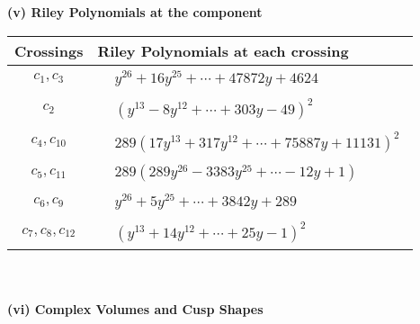 \documentclass[1p]{elsarticle_modified}
\theoremstyle{definition}
\begin{document}
\newpage\renewcommand{\arraystretch}{1}
\flushleft \textbf{(v) Riley Polynomials at the component}\newline \\
\begin{tabular}{m{50pt}|m{274pt}}
Crossings & \hspace{64pt}Riley Polynomials at each crossing \\
\hline $$\begin{aligned}c_{1},c_{3}\end{aligned}$$&$\begin{aligned}
&y^{26}+16 y^{25}+\cdots+47872 y+4624
\end{aligned}$\\
\hline $$\begin{aligned}c_{2}\end{aligned}$$&$\begin{aligned}
&(y^{13}-8 y^{12}+\cdots+303 y-49)^{2}
\end{aligned}$\\
\hline $$\begin{aligned}c_{4},c_{10}\end{aligned}$$&$\begin{aligned}
&289(17 y^{13}+317 y^{12}+\cdots+75887 y+11131)^{2}
\end{aligned}$\\
\hline $$\begin{aligned}c_{5},c_{11}\end{aligned}$$&$\begin{aligned}
&289(289 y^{26}-3383 y^{25}+\cdots-12 y+1)
\end{aligned}$\\
\hline $$\begin{aligned}c_{6},c_{9}\end{aligned}$$&$\begin{aligned}
&y^{26}+5 y^{25}+\cdots+3842 y+289
\end{aligned}$\\
\hline $$\begin{aligned}c_{7},c_{8},c_{12}\end{aligned}$$&$\begin{aligned}
&(y^{13}+14 y^{12}+\cdots+25 y-1)^{2}
\end{aligned}$\\
\hline
\end{tabular}\\~\\
\newpage\flushleft \textbf{(vi) Complex Volumes and Cusp Shapes}
\end{document}
